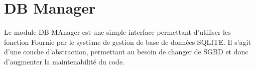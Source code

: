 \section{DB Manager} 

Le module DB MAnager est une simple interface permettant d'utiliser les fonction Fournie par le système de gestion de base de données SQLITE. Il s'agit d'une couche d'abstraction, permettant au besoin de changer de SGBD et donc d'augmenter la maintenabilité du code. 


